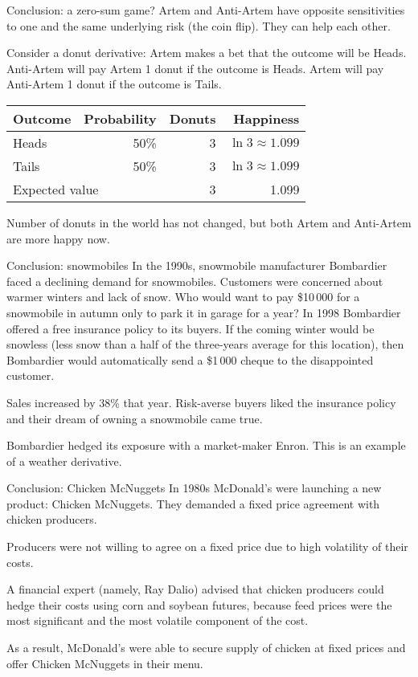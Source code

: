 \documentclass{beamer}
\begin{document}
\begin{frame}{Conclusion: a zero-sum game?}
\justify
Artem and Anti-Artem have opposite sensitivities to one and the same underlying risk (the coin flip). They can help each other.

\justify
Consider a donut derivative: Artem makes a bet that the outcome will be Heads. Anti-Artem will pay Artem 1 donut if the outcome is Heads. Artem will pay Anti-Artem 1 donut if the outcome is Tails.

\justify
\centering
\begin{tabular}{l|r|r|r}
Outcome & Probability & Donuts & Happiness \\ \hline
Heads & 50\% & 3 & $\ln 3 \approx 1.099$ \\
Tails & 50\% & 3 & $\ln 3 \approx 1.099$ \\ \hline
\multicolumn{2}{l|}{Expected value} & 3 & 1.099
\end{tabular}

\justify
Number of donuts in the world has not changed, but both Artem and Anti-Artem are more happy now.
\end{frame}



\begin{frame}{Conclusion: snowmobiles}
\justify
 In  the 1990s, snowmobile manufacturer Bombardier faced a declining demand for snowmobiles. Customers were concerned about warmer winters and lack of snow.  Who would want to pay \$10\,000 for a snowmobile in autumn only to park it in garage for a year?
\justify
In 1998 Bombardier offered a free insurance policy to its buyers. If the coming winter would be snowless (less snow than a half of the three-years average for this location), then Bombardier would automatically send a \$1\,000 cheque to the disappointed customer.

\justify
Sales increased by 38\% that year. Risk-averse buyers liked the insurance policy and their dream of owning a snowmobile came true.

\justify
Bombardier hedged its exposure with a market-maker Enron. This is an example of a weather derivative.
\end{frame}




\begin{frame}{Conclusion: Chicken McNuggets}
\justify
In 1980s McDonald's were launching a new product: Chicken McNuggets. They demanded a fixed price agreement  with chicken producers.

\justify
Producers were not willing to agree on a fixed price due to high volatility of their costs.

\justify
A financial expert (namely, Ray Dalio) advised that chicken producers could hedge their costs using corn and soybean futures, because feed prices were the most significant and the most volatile component of the cost.

\justify
As a result, McDonald's were able to secure supply of chicken at fixed prices and offer Chicken McNuggets in their menu. 
\end{frame}
\end{document}
